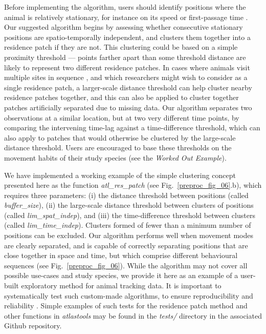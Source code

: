 Before implementing the algorithm, users should identify positions where the animal is relatively stationary, for instance on its speed or first-passage time \citep{bracis2018,barraquand2008}.
Our suggested algorithm begins by assessing whether consecutive stationary positions are spatio-temporally independent, and clusters them together into a residence patch if they are not.
This clustering could be based on a simple proximity threshold --- points farther apart than some threshold distance are likely to represent two different residence patches.
In cases where animals visit multiple sites in sequence \citep[such as traplining:][]{thomson1997}, and which researchers might wish to consider as a single residence patch, a larger-scale distance threshold can help cluster nearby residence patches together, and this can also be applied to cluster together patches artificially separated due to missing data.
Our algorithm separates two observations at a similar location, but at two very different time points, by comparing the intervening time-lag against a time-difference threshold, which can also apply to patches that would otherwise be clustered by the large-scale distance threshold.
Users are encouraged to base these thresholds on the movement habits of their study species (see the \textit{Worked Out Example}).

We have implemented a working example of the simple clustering concept presented here as the function \textit{atl\_res\_patch} (see Fig.~\ref{preproc_fig_06}.b), which requires three parameters: (i) the distance threshold between positions (called \textit{buffer\_size}), (ii) the large-scale distance threshold between clusters of positions (called \textit{lim\_spat\_indep}), and (iii) the time-difference threshold between clusters (called \textit{lim\_time\_indep}).
Clusters formed of fewer than a minimum number of positions can be excluded.
Our algorithm performs well when movement modes are clearly separated, and is capable of correctly separating positions that are close together in space and time, but which comprise different behavioural sequences (see Fig.~\ref{preproc_fig_06}).
While the algorithm may not cover all possible use-cases and study species, we provide it here as an example of a user-built exploratory method for animal tracking data.
It is important to systematically test such custom-made algorithms, to ensure reproducibility and reliability \citep{wickham2015, marwick2018}.
Simple examples of such tests for the residence patch method and other functions in \textit{atlastools} may be found in the \textit{tests/} directory in the associated Github repository.


